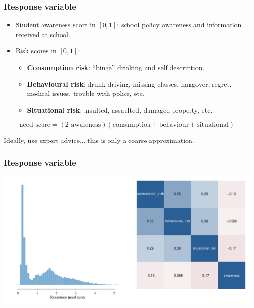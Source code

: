 \documentclass{beamer}
\begin{document}
\begin{frame} \frametitle{Response variable}

\begin{itemize}
  \item Student awareness score in $[0,1]$: school policy awareness and information received at school.
  \item Risk scores in $[0,1]$:
    \begin{itemize}
       \item \textbf{Consumption risk}: ``binge'' drinking and self description.
       \item \textbf{Behavioural risk}: drunk driving, missing classes, hangover, regret, medical issues, trouble with police, etc.
       \item \textbf{Situational risk}: insulted, assaulted, damaged property, etc.
    \end{itemize}
\end{itemize}

$$
  \text{need score} = (\text{2-awareness}) (\text{consumption} + \text{behaviour} + \text{situational})
$$

Ideally, use expert advice... this is only a coarse approximation.



\end{frame}

\begin{frame} \frametitle{Response variable}

  \begin{center}
    \includegraphics[width=1.05 \linewidth]{Figures/response}
  \end{center}

\end{frame}
\end{document}
